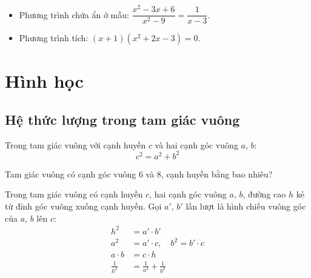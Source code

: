 \documentclass[12pt,a4paper]{article}
\begin{document}
\begin{vidu}
  \begin{itemize}
    \item Phương trình chứa ẩn ở mẫu: $\dfrac{x^2 - 3x + 6}{x^2 - 9} = \dfrac{1}{x - 3}$.
    \item Phương trình tích: $(x + 1)(x^2 + 2x - 3) = 0$.
  \end{itemize}
\end{vidu}


\section{Hình học}

\subsection{Hệ thức lượng trong tam giác vuông}

\begin{dinhly}[title={Định lý Pythagore}]
  Trong tam giác vuông với cạnh huyền $c$ và hai cạnh góc vuông $a$, $b$:
  \[c^2 = a^2 + b^2\]
\end{dinhly}

\begin{vidu}
  Tam giác vuông có cạnh góc vuông $6$ và $8$, cạnh huyền bằng bao nhiêu?
\end{vidu}

\begin{congthuc}[title={Hệ thức lượng}]
  Trong tam giác vuông có cạnh huyền $c$, hai cạnh góc vuông $a$, $b$, đường cao $h$ kẻ từ đỉnh góc vuông xuống cạnh huyền. Gọi $a'$, $b'$ lần lượt là hình chiếu vuông góc của $a$, $b$ lên $c$:
  \begin{align*}
    h^2 &= a' \cdot b' \\
    a^2 &= a' \cdot c, \quad b^2 = b' \cdot c \\
    a \cdot b &= c \cdot h \\
    \frac{1}{h^2} &= \frac{1}{a^2} + \frac{1}{b^2}
  \end{align*}
\end{congthuc}

\end{document}

